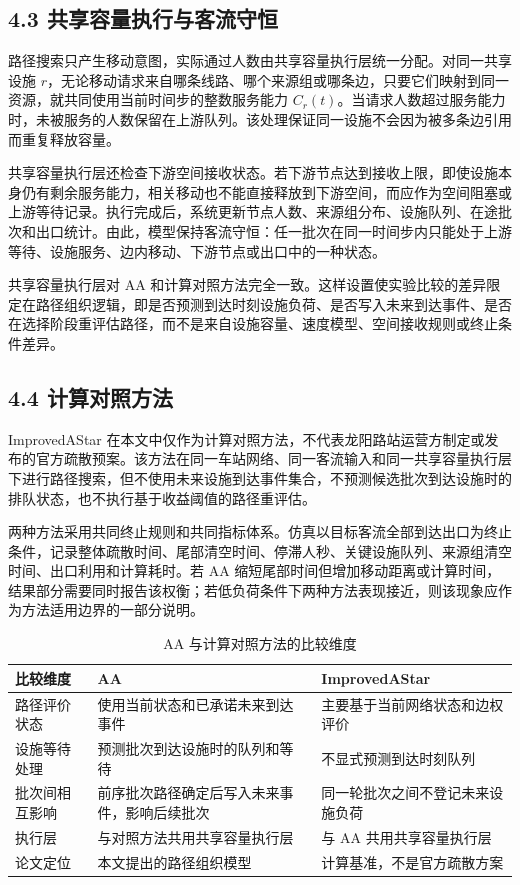 \documentclass[UTF8,a4paper,12pt]{ctexart}
\begin{document}
\subsection{4.3 共享容量执行与客流守恒}

路径搜索只产生移动意图，实际通过人数由共享容量执行层统一分配。对同一共享设施 \(r\)，无论移动请求来自哪条线路、哪个来源组或哪条边，只要它们映射到同一资源，就共同使用当前时间步的整数服务能力 \(C_r(t)\)。当请求人数超过服务能力时，未被服务的人数保留在上游队列。该处理保证同一设施不会因为被多条边引用而重复释放容量。

共享容量执行层还检查下游空间接收状态。若下游节点达到接收上限，即使设施本身仍有剩余服务能力，相关移动也不能直接释放到下游空间，而应作为空间阻塞或上游等待记录。执行完成后，系统更新节点人数、来源组分布、设施队列、在途批次和出口统计。由此，模型保持客流守恒：任一批次在同一时间步内只能处于上游等待、设施服务、边内移动、下游节点或出口中的一种状态。

共享容量执行层对 AA 和计算对照方法完全一致。这样设置使实验比较的差异限定在路径组织逻辑，即是否预测到达时刻设施负荷、是否写入未来到达事件、是否在选择阶段重评估路径，而不是来自设施容量、速度模型、空间接收规则或终止条件差异。

\subsection{4.4 计算对照方法}

ImprovedAStar 在本文中仅作为计算对照方法，不代表龙阳路站运营方制定或发布的官方疏散预案。该方法在同一车站网络、同一客流输入和同一共享容量执行层下进行路径搜索，但不使用未来设施到达事件集合，不预测候选批次到达设施时的排队状态，也不执行基于收益阈值的路径重评估。

两种方法采用共同终止规则和共同指标体系。仿真以目标客流全部到达出口为终止条件，记录整体疏散时间、尾部清空时间、停滞人秒、关键设施队列、来源组清空时间、出口利用和计算耗时。若 AA 缩短尾部时间但增加移动距离或计算时间，结果部分需要同时报告该权衡；若低负荷条件下两种方法表现接近，则该现象应作为方法适用边界的一部分说明。

\begin{table}[htbp]
\centering
\caption{AA 与计算对照方法的比较维度}
\small
\begin{tabular}{p{}p{}p{}}
\toprule
比较维度 & AA & ImprovedAStar \\
\midrule
路径评价状态 & 使用当前状态和已承诺未来到达事件 & 主要基于当前网络状态和边权评价 \\
设施等待处理 & 预测批次到达设施时的队列和等待 & 不显式预测到达时刻队列 \\
批次间相互影响 & 前序批次路径确定后写入未来事件，影响后续批次 & 同一轮批次之间不登记未来设施负荷 \\
执行层 & 与对照方法共用共享容量执行层 & 与 AA 共用共享容量执行层 \\
论文定位 & 本文提出的路径组织模型 & 计算基准，不是官方疏散方案 \\
\bottomrule
\end{tabular}
\end{table}
\end{document}
